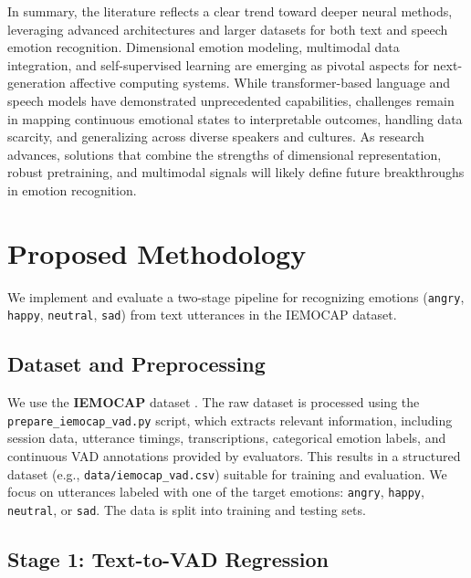\documentclass[conference]{IEEEtran}
\begin{document}
In summary, the literature reflects a clear trend toward deeper neural methods, leveraging advanced architectures and larger datasets for both text and speech emotion recognition. Dimensional emotion modeling, multimodal data integration, and self-supervised learning are emerging as pivotal aspects for next-generation affective computing systems. While transformer-based language and speech models have demonstrated unprecedented capabilities, challenges remain in mapping continuous emotional states to interpretable outcomes, handling data scarcity, and generalizing across diverse speakers and cultures. As research advances, solutions that combine the strengths of dimensional representation, robust pretraining, and multimodal signals will likely define future breakthroughs in emotion recognition.

\section{Proposed Methodology}
We implement and evaluate a two-stage pipeline for recognizing emotions (\texttt{angry}, \texttt{happy}, \texttt{neutral}, \texttt{sad}) from text utterances in the IEMOCAP dataset.

\subsection{Dataset and Preprocessing}
We use the \textbf{IEMOCAP} dataset \cite{busso2008iemocap}. The raw dataset is processed using the \texttt{prepare\_iemocap\_vad.py} script, which extracts relevant information, including session data, utterance timings, transcriptions, categorical emotion labels, and continuous VAD annotations provided by evaluators. This results in a structured dataset (e.g., \texttt{data/iemocap\_vad.csv}) suitable for training and evaluation. We focus on utterances labeled with one of the target emotions: \texttt{angry}, \texttt{happy}, \texttt{neutral}, or \texttt{sad}. The data is split into training and testing sets.

\subsection{Stage 1: Text-to-VAD Regression}
\end{document}
